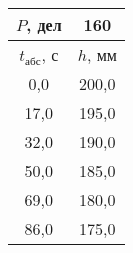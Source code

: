 \begin{tabular}[t]{|c|c|}
\hline
$P$, дел & 160 \\
\hline
$t_{абс}$, с & $h$, мм \\ 
\hline
0,0 & 200,0 \\ 
17,0 & 195,0 \\ 
32,0 & 190,0 \\ 
50,0 & 185,0 \\ 
69,0 & 180,0 \\ 
86,0 & 175,0 \\ 
\hline
\end{tabular}